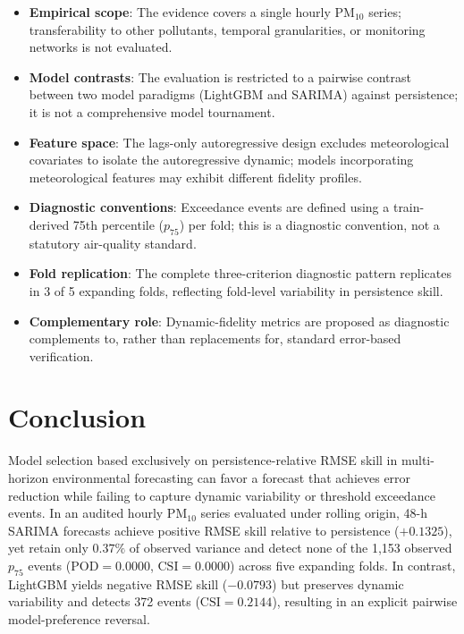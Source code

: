 \documentclass[12pt]{article}
\begin{document}
\begin{itemize}
  \item \textbf{Empirical scope}: The evidence covers a single hourly $\mathrm{PM}_{10}$ series; transferability to other pollutants, temporal granularities, or monitoring networks is not evaluated.
  \item \textbf{Model contrasts}: The evaluation is restricted to a pairwise contrast between two model paradigms (LightGBM and SARIMA) against persistence; it is not a comprehensive model tournament.
  \item \textbf{Feature space}: The lags-only autoregressive design excludes meteorological covariates to isolate the autoregressive dynamic; models incorporating meteorological features may exhibit different fidelity profiles.
  \item \textbf{Diagnostic conventions}: Exceedance events are defined using a train-derived 75th percentile ($p_{75}$) per fold; this is a diagnostic convention, not a statutory air-quality standard.
  \item \textbf{Fold replication}: The complete three-criterion diagnostic pattern replicates in 3 of 5 expanding folds, reflecting fold-level variability in persistence skill.
  \item \textbf{Complementary role}: Dynamic-fidelity metrics are proposed as diagnostic complements to, rather than replacements for, standard error-based verification.
\end{itemize}

\section{Conclusion}
\label{sec:conclusion}

Model selection based exclusively on persistence-relative RMSE skill in multi-horizon environmental forecasting can favor a forecast that achieves error reduction while failing to capture dynamic variability or threshold exceedance events. In an audited hourly $\mathrm{PM}_{10}$ series evaluated under rolling origin, 48-h SARIMA forecasts achieve positive RMSE skill relative to persistence ($+0.1325$), yet retain only $0.37\%$ of observed variance and detect none of the 1,153 observed $p_{75}$ events ($\mathrm{POD} = 0.0000$, $\mathrm{CSI} = 0.0000$) across five expanding folds. In contrast, LightGBM yields negative RMSE skill ($-0.0793$) but preserves dynamic variability and detects 372 events ($\mathrm{CSI} = 0.2144$), resulting in an explicit pairwise model-preference reversal.
\end{document}
